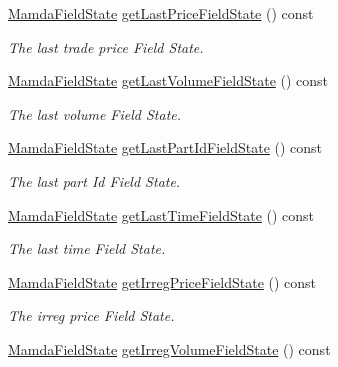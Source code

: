 \begin{CompactItemize}
\hyperlink{namespaceWombat_93aac974f2ab713554fd12a1fa3b7d2a}{Mamda\-Field\-State} \hyperlink{classWombat_1_1MamdaTradeListener_1374642c578867d0b51dff83e5b2a99f}{get\-Last\-Price\-Field\-State} () const 
\begin{CompactList}\small\item\em The last trade price Field State. \item\end{CompactList}\item 
\hyperlink{namespaceWombat_93aac974f2ab713554fd12a1fa3b7d2a}{Mamda\-Field\-State} \hyperlink{classWombat_1_1MamdaTradeListener_049bea66cd1715f50a3f894137810b30}{get\-Last\-Volume\-Field\-State} () const 
\begin{CompactList}\small\item\em The last volume Field State. \item\end{CompactList}\item 
\hyperlink{namespaceWombat_93aac974f2ab713554fd12a1fa3b7d2a}{Mamda\-Field\-State} \hyperlink{classWombat_1_1MamdaTradeListener_7ecf8dab22bff20d0f5b909d81f67dcb}{get\-Last\-Part\-Id\-Field\-State} () const 
\begin{CompactList}\small\item\em The last part Id Field State. \item\end{CompactList}\item 
\hyperlink{namespaceWombat_93aac974f2ab713554fd12a1fa3b7d2a}{Mamda\-Field\-State} \hyperlink{classWombat_1_1MamdaTradeListener_3949dbc87861899ae66b1ee7173011b4}{get\-Last\-Time\-Field\-State} () const 
\begin{CompactList}\small\item\em The last time Field State. \item\end{CompactList}\item 
\hyperlink{namespaceWombat_93aac974f2ab713554fd12a1fa3b7d2a}{Mamda\-Field\-State} \hyperlink{classWombat_1_1MamdaTradeListener_5c3e195cc4c8d41f3a56e9c9a39730dd}{get\-Irreg\-Price\-Field\-State} () const 
\begin{CompactList}\small\item\em The irreg price Field State. \item\end{CompactList}\item 
\hyperlink{namespaceWombat_93aac974f2ab713554fd12a1fa3b7d2a}{Mamda\-Field\-State} \hyperlink{classWombat_1_1MamdaTradeListener_8e6b4c395a5dcebe1439553445f5f374}{get\-Irreg\-Volume\-Field\-State} () const 

\end{CompactItemize}
